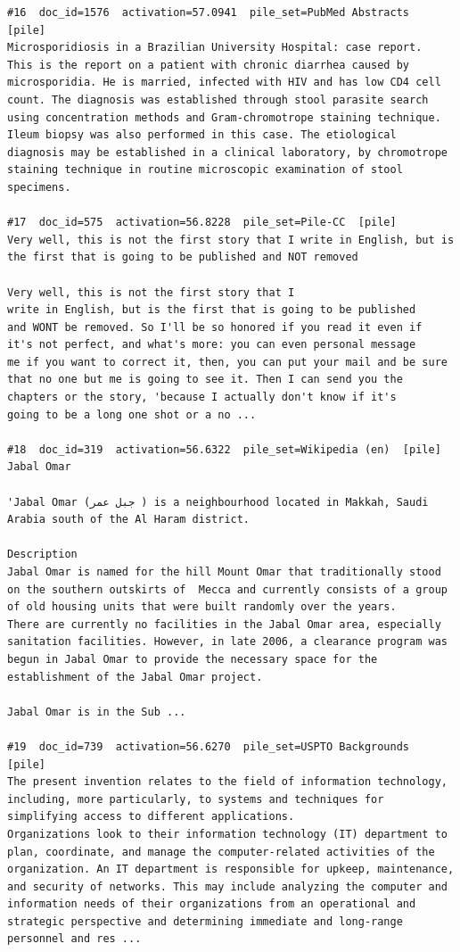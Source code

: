 \begin{verbatim}
#16  doc_id=1576  activation=57.0941  pile_set=PubMed Abstracts  [pile]
Microsporidiosis in a Brazilian University Hospital: case report.
This is the report on a patient with chronic diarrhea caused by microsporidia. He is married, infected with HIV and has low CD4 cell count. The diagnosis was established through stool parasite search using concentration methods and Gram-chromotrope staining technique. Ileum biopsy was also performed in this case. The etiological diagnosis may be established in a clinical laboratory, by chromotrope staining technique in routine microscopic examination of stool specimens.

#17  doc_id=575  activation=56.8228  pile_set=Pile-CC  [pile]
Very well, this is not the first story that I write in English, but is the first that is going to be published and NOT removed

Very well, this is not the first story that I
write in English, but is the first that is going to be published
and WONT be removed. So I'll be so honored if you read it even if
it's not perfect, and what's more: you can even personal message
me if you want to correct it, then, you can put your mail and be sure
that no one but me is going to see it. Then I can send you the
chapters or the story, 'because I actually don't know if it's
going to be a long one shot or a no ...

#18  doc_id=319  activation=56.6322  pile_set=Wikipedia (en)  [pile]
Jabal Omar

'Jabal Omar (جبل عمر ) is a neighbourhood located in Makkah, Saudi Arabia south of the Al Haram district.

Description 
Jabal Omar is named for the hill Mount Omar that traditionally stood on the southern outskirts of  Mecca and currently consists of a group of old housing units that were built randomly over the years. 
There are currently no facilities in the Jabal Omar area, especially sanitation facilities. However, in late 2006, a clearance program was begun in Jabal Omar to provide the necessary space for the establishment of the Jabal Omar project. 

Jabal Omar is in the Sub ...

#19  doc_id=739  activation=56.6270  pile_set=USPTO Backgrounds  [pile]
The present invention relates to the field of information technology, including, more particularly, to systems and techniques for simplifying access to different applications.
Organizations look to their information technology (IT) department to plan, coordinate, and manage the computer-related activities of the organization. An IT department is responsible for upkeep, maintenance, and security of networks. This may include analyzing the computer and information needs of their organizations from an operational and strategic perspective and determining immediate and long-range personnel and res ...


\end{verbatim}
